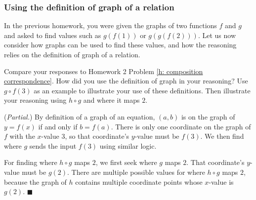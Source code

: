 \documentclass[11pt]{article}
\newenvironment{task}
	{\begin{mdframed}[linecolor=lightgray, linewidth=3pt]\raggedright}
	{\end{mdframed}}
\theoremstyle{definition}
\newenvironment{solution}{{\it Solution.} }{\hfill {\color{lightgray}$\blacksquare$}}
\begin{document}

\vspace*{-4pt}
\subsubsection{Using the definition of graph of a relation}
In the previous homework, you were given the graphs of two functions $f$ and $g$ and asked to find values such as $g(f(1))$ or $g(g(f(2)))$.  Let us now consider how graphs can be used to find these values, and how the reasoning relies on the definition of graph of a relation.

\begin{task}
Compare your responses to Homework 2 Problem \ref{h: composition correspondence}. How did you use the definition of graph in your reasoning? Use $g\circ f(3)$ as an example to illustrate your use of these definitions. Then illustrate your reasoning using $h\circ g$ and where it maps $2$.

\vspace*{-12pt}
\begin{center}
%
\end{center}

\end{task} 

\begin{solution}({\it Partial.})
By definition of a graph of an equation, $(a, b)$ is on the graph of $y=f(x)$ if and only if $b=f(a)$. There is only one coordinate on the graph of $f$ with the $x$-value 3, so that coordinate's $y$-value must be $f(3)$. We then find where $g$ sends the input $f(3)$ using similar logic.

For finding where $h\circ g$ maps $2$, we first seek where $g$ maps $2$. That coordinate's $y$-value must be $g(2)$. There are multiple possible values for where $h\circ g$ maps $2$, because the graph of $h$ contains multiple coordinate points whose $x$-value is $g(2)$.
\end{solution}
\end{document}
